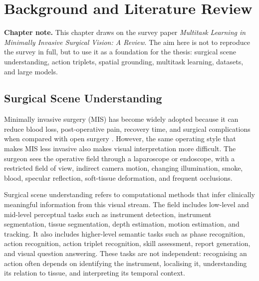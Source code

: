 \chapter{Background and Literature Review}
\label{chap:background}
\minitoc

\begin{center}
\begin{minipage}[b]{0.9\linewidth}
\small
\textbf{Chapter note.}
This chapter draws on the survey paper \emph{Multitask Learning in Minimally Invasive Surgical Vision: A Review}. The aim here is not to reproduce the survey in full, but to use it as a foundation for the thesis: surgical scene understanding, action triplets, spatial grounding, multitask learning, datasets, and large models.
\end{minipage}
\end{center}

\section{Surgical Scene Understanding}
\label{sec:background-scene-understanding}

Minimally invasive surgery (MIS) has become widely adopted because it can reduce blood loss, post-operative pain, recovery time, and surgical complications when compared with open surgery \cite{jaffray2005minimally}. However, the same operating style that makes MIS less invasive also makes visual interpretation more difficult. The surgeon sees the operative field through a laparoscope or endoscope, with a restricted field of view, indirect camera motion, changing illumination, smoke, blood, specular reflection, soft-tissue deformation, and frequent occlusions.

Surgical scene understanding refers to computational methods that infer clinically meaningful information from this visual stream. The field includes low-level and mid-level perceptual tasks such as instrument detection, instrument segmentation, tissue segmentation, depth estimation, motion estimation, and tracking. It also includes higher-level semantic tasks such as phase recognition, action recognition, action triplet recognition, skill assessment, report generation, and visual question answering. These tasks are not independent: recognising an action often depends on identifying the instrument, localising it, understanding its relation to tissue, and interpreting its temporal context.

